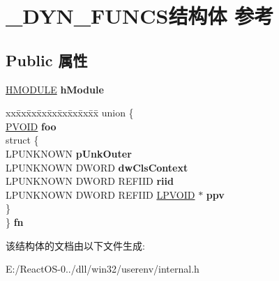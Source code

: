 \hypertarget{struct___d_y_n___f_u_n_c_s}{}\section{\+\_\+\+D\+Y\+N\+\_\+\+F\+U\+N\+C\+S结构体 参考}
\label{struct___d_y_n___f_u_n_c_s}
\subsection*{Public 属性}
\begin{DoxyCompactItemize}
\item 
\mbox{\label{struct___d_y_n___f_u_n_c_s_a4e95840a3bad9827b1e6298224780519}} 
\hyperlink{interfacevoid}{H\+M\+O\+D\+U\+LE} {\bfseries h\+Module}
\item 
\mbox{\label{struct___d_y_n___f_u_n_c_s_a94473b8d0e5cd1472d7aa3cbe922c124}} 
\begin{tabbing}
xx\=xx\=xx\=xx\=xx\=xx\=xx\=xx\=xx\=\kill
union \{\\
\>\hyperlink{interfacevoid}{PVOID} {\bfseries foo}\\
\mbox{\label{union___d_y_n___f_u_n_c_s_1_1_0D501_ac578a9f52729590e2a326b6605ab39a7}} 
\>struct \{\\
\>\>LPUNKNOWN {\bfseries pUnkOuter}\\
\>\>LPUNKNOWN DWORD {\bfseries dwClsContext}\\
\>\>LPUNKNOWN DWORD REFIID {\bfseries riid}\\
\>\>LPUNKNOWN DWORD REFIID \hyperlink{interfacevoid}{LPVOID} $\ast$ {\bfseries ppv}\\
\>\} \\
\} {\bfseries fn}\\

\end{tabbing}\end{DoxyCompactItemize}


该结构体的文档由以下文件生成\+:\begin{DoxyCompactItemize}
\item 
E\+:/\+React\+O\+S-\/0../dll/win32/userenv/internal.\+h\end{DoxyCompactItemize}
